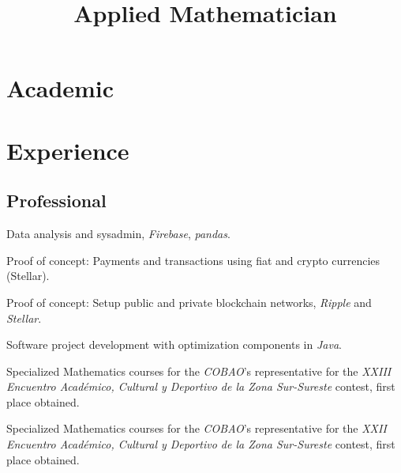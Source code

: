 \documentclass[11pt,letter]{moderncv}
\title{Applied \mbox{Mathematician}}
\begin{document}
\maketitle

\section{Academic}
\label{sec:formacion-academica}


\section{Experience}
\label{sec:experiencia}
\subsection{Professional}
\label{sec:profesional}


 {Data analysis and sysadmin, \emph{Firebase}, \emph{pandas}.}

 {Proof of concept: Payments and transactions using fiat and crypto currencies (Stellar).}


 {Proof of concept: Setup public and private blockchain networks, \emph{Ripple} and \emph{Stellar}.}


 {Software project development with optimization components in {\em Java}.}

 {Specialized Mathematics
  courses for the {\em COBAO}'s representative for the {\em XXIII
    Encuentro Académico, Cultural y Deportivo de la Zona Sur-Sureste}
  contest, first place obtained.}

 {Specialized Mathematics
  courses for the {\em COBAO}'s representative for the {\em XXII
    Encuentro Académico, Cultural y Deportivo de la Zona Sur-Sureste}
  contest, first place obtained.}
\end{document}
